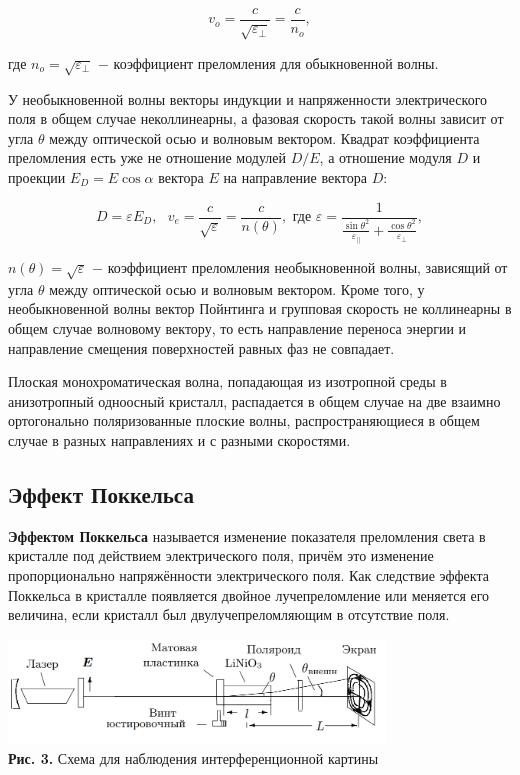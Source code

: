 \documentclass[a4paper,12pt]{article} %
\begin{document}
\begin{equation}\label{ linkname }
v_{o} = \frac{c} {\sqrt{\varepsilon_{\perp}}} = \frac{c}{n_{o}},
\end{equation}

\hfill \break где $n_{o} = \sqrt{\varepsilon_{\perp}}$ $-$ коэффициент преломления для обыкновенной волны.

\hfill \break У необыкновенной волны векторы индукции и напряженности электрического поля в общем случае неколлинеарны, а фазовая скорость такой волны зависит от угла $\theta$ между оптической осью и волновым вектором. Квадрат коэффициента преломления есть уже не отношение модулей $D/E$, а отношение модуля $D$ и проекции $E_{D} = E \cos{\alpha}$ вектора $E$ на направление вектора $D$:

\begin{equation}\label{ linkname }
D = \varepsilon E_{D}, \text{ } v_{e} = \frac{c}{\sqrt{\varepsilon}} = \frac {c} {n(\theta)}, \text{ где } \varepsilon = \frac {1} {\frac {\sin{\theta}^2} {\varepsilon_{||}} + \frac {\cos{\theta}^2}{\varepsilon_{\perp}} },
\end{equation}

\hfill \break $n(\theta) = \sqrt{\varepsilon}$ $-$ коэффициент преломления необыкновенной волны, зависящий от угла $\theta$ между оптической осью и волновым вектором. Кроме того, у необыкновенной волны вектор Пойнтинга и групповая скорость не коллинеарны в общем случае волновому вектору, то есть направление переноса энергии и направление смещения поверхностей равных фаз не совпадает.

\hfill \break Плоская монохроматическая волна, попадающая из изотропной среды в анизотропный одноосный кристалл, распадается в общем случае на две взаимно ортогонально поляризованные плоские волны, распространяющиеся в общем случае в разных направлениях и с разными скоростями.

\subsection{Эффект Поккельса}
\hfill \break \textbf{Эффектом Поккельса} называется изменение показателя преломления света в кристалле под действием электрического поля, причём это изменение пропорционально напряжённости электрического поля. Как следствие эффекта Поккельса в кристалле появляется двойное лучепреломление или меняется его величина, если кристалл был двулучепреломляющим в отсутствие поля.

\begin{center}
\includegraphics[width=0.75\textwidth]{4.7.2_3.png}\\
\textbf{Рис. 3.} Схема для наблюдения интерференционной картины \\
\end{center}
	
\end{document}
